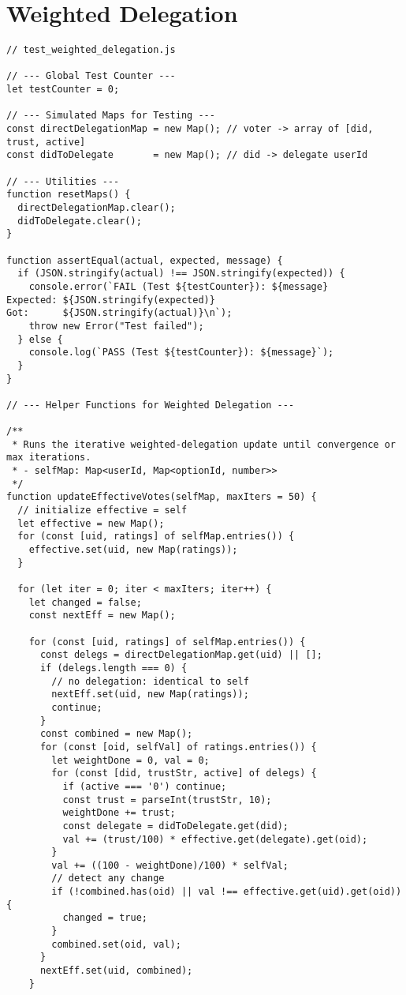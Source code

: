 \section{Weighted Delegation}
\begin{verbatim}
// test_weighted_delegation.js

// --- Global Test Counter ---
let testCounter = 0;

// --- Simulated Maps for Testing ---
const directDelegationMap = new Map(); // voter -> array of [did, trust, active]
const didToDelegate       = new Map(); // did -> delegate userId

// --- Utilities ---
function resetMaps() {
  directDelegationMap.clear();
  didToDelegate.clear();
}

function assertEqual(actual, expected, message) {
  if (JSON.stringify(actual) !== JSON.stringify(expected)) {
    console.error(`FAIL (Test ${testCounter}): ${message}
Expected: ${JSON.stringify(expected)}
Got:      ${JSON.stringify(actual)}\n`);
    throw new Error("Test failed");
  } else {
    console.log(`PASS (Test ${testCounter}): ${message}`);
  }
}

// --- Helper Functions for Weighted Delegation ---

/**
 * Runs the iterative weighted-delegation update until convergence or max iterations.
 * - selfMap: Map<userId, Map<optionId, number>>
 */
function updateEffectiveVotes(selfMap, maxIters = 50) {
  // initialize effective = self
  let effective = new Map();
  for (const [uid, ratings] of selfMap.entries()) {
    effective.set(uid, new Map(ratings));
  }

  for (let iter = 0; iter < maxIters; iter++) {
    let changed = false;
    const nextEff = new Map();

    for (const [uid, ratings] of selfMap.entries()) {
      const delegs = directDelegationMap.get(uid) || [];
      if (delegs.length === 0) {
        // no delegation: identical to self
        nextEff.set(uid, new Map(ratings));
        continue;
      }
      const combined = new Map();
      for (const [oid, selfVal] of ratings.entries()) {
        let weightDone = 0, val = 0;
        for (const [did, trustStr, active] of delegs) {
          if (active === '0') continue;
          const trust = parseInt(trustStr, 10);
          weightDone += trust;
          const delegate = didToDelegate.get(did);
          val += (trust/100) * effective.get(delegate).get(oid);
        }
        val += ((100 - weightDone)/100) * selfVal;
        // detect any change
        if (!combined.has(oid) || val !== effective.get(uid).get(oid)) {
          changed = true;
        }
        combined.set(oid, val);
      }
      nextEff.set(uid, combined);
    }


\end{verbatim}
